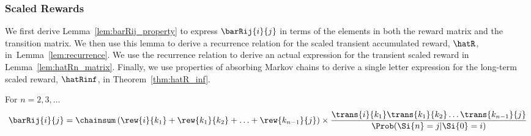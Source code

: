 \subsubsection{Scaled Rewards}
\label{subsec:scaled_rewards}

We first derive Lemma~\ref{lem:barRij_property} to express $\barRij{i}{j}$ in terms of the elements in both the reward matrix and the transition matrix.  We then use this lemma to derive a recurrence relation for the scaled transient accumulated reward, $\hatR$, in~Lemma~\ref{lem:recurrence}.  We use the recurrence relation to derive an actual expression for the transient scaled reward in Lemma~\ref{lem:hatRn_matrix}.  Finally, we use properties of absorbing Markov chains to derive a single letter expression for the long-term scaled reward, $\hatRinf$, in Theorem~\ref{thm:hatR_inf}.

\begin{myLemma}
	\label{lem:barRij_property}
	For $n = 2, 3, \ldots $
	\begin{equation}
		\barRij{i}{j} = \chainsum \left( \rew{i}{k_1} + \rew{k_1}{k_2} + \ldots + \rew{k_{n-1}}{j}\right) \times \frac{\trans{i}{k_1}\trans{k_1}{k_2} \ldots \trans{k_{n-1}}{j}}{\Prob(\Si{n} = j| \Si{0} = i)} 
	\end{equation}
\end{myLemma}


